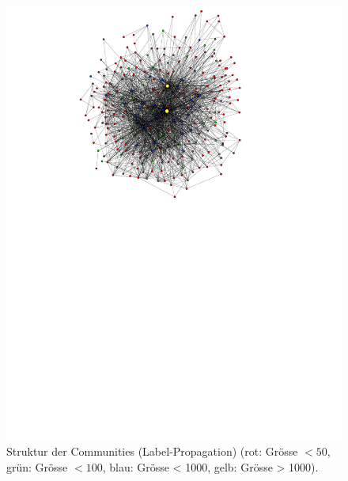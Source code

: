 \begin{figure}[h]
  \centering
  \includegraphics[scale=1.5]{images/label-prop-metagraph-20-narrow-cut.pdf}
  \caption{Struktur der Communities (Label-Propagation) (rot: Gr\"osse
    $<50$, gr\"un: Gr\"osse $<100$, blau: Gr\"osse < 1000, gelb:
    Gr\"osse > 1000).}
  \label{fig:metagraph-com-label}
\end{figure}


